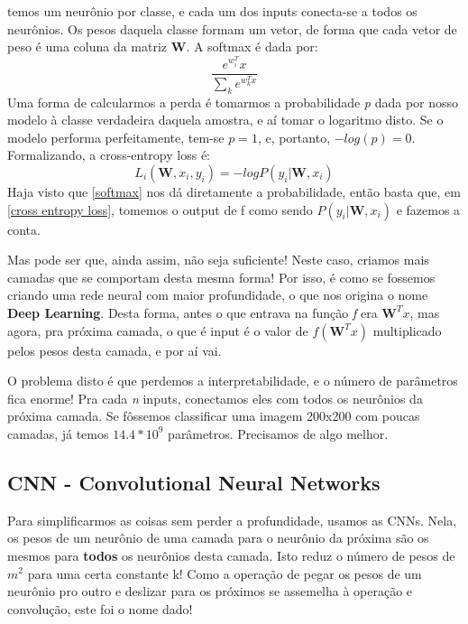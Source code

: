 \documentclass{article}
\begin{document}
temos um neurônio por classe, e cada um dos inputs conecta-se a todos os neurônios. Os pesos daquela classe formam um vetor, de forma que cada vetor de peso é uma coluna da matriz \textbf{W}. A softmax é dada por:
\begin{equation}
    \frac{e^{w_{i}^{T}}{x}}{\sum_{k}e^{w_{k}^{T}x}} \label{softmax}
\end{equation}
Uma forma de calcularmos a perda é tomarmos a probabilidade \textit{p} dada por nosso modelo à classe verdadeira daquela amostra, e aí tomar o logaritmo disto. Se o modelo performa perfeitamente, tem-se $p = 1$, e, portanto, $-log(p) = 0$. Formalizando, a cross-entropy loss é:
\begin{equation}
    L_i(\textbf{W}, x_i, y_i) = - log P(y_i |\textbf{W}, x_i) \label{cross entropy loss}
\end{equation}
Haja visto que \ref{softmax} nos dá diretamente a probabilidade, então basta que, em \ref{cross entropy loss}, tomemos o output de f como sendo $P(y_i |\textbf{W}, x_i)$ e fazemos a conta. \par
Mas pode ser que, ainda assim, não seja suficiente! Neste caso, criamos mais camadas que se comportam desta mesma forma! Por isso, é como se fossemos criando uma rede neural com maior profundidade, o que nos origina o nome \textbf{Deep Learning}. Desta forma, antes o que entrava na função \textit{f} era $\textbf{W}^{T}x$, mas agora, pra próxima camada, o que é input é o valor de $\textit{f}(\textbf{W}^{T}x)$ multiplicado pelos pesos desta camada, e por aí vai.  \par
O problema disto é que perdemos a interpretabilidade, e o número de parâmetros fica enorme! Pra cada \textit{n} inputs, conectamos eles com todos os neurônios da próxima camada. Se fôssemos classificar uma imagem 200x200 com poucas camadas, já temos $14.4 * 10^9$ parâmetros. Precisamos de algo melhor.

\subsection{CNN - Convolutional Neural Networks}

Para simplificarmos as coisas sem perder a profundidade, usamos as CNNs. Nela, os pesos de um neurônio de uma camada para o neurônio da próxima são os mesmos para \textbf{todos} os neurônios desta camada. Isto reduz o número de pesos de $m^2$ para uma certa constante k! Como a operação de pegar os pesos de um neurônio pro outro e deslizar para os próximos se assemelha à operação e convolução, este foi o nome dado!
\end{document}
